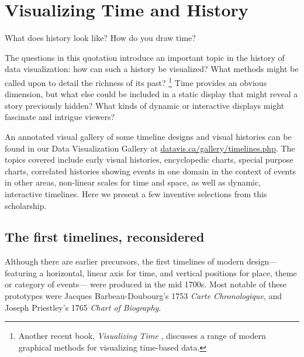 \section{Visualizing Time and History}\label{sec:vistime}

\epigraph{What does history look like?  How do you draw time?}{\citet[p. 10]{RosenbergGrafton:2010}}
The questions in this quotation introduce an important topic in the history of data visualization:  how can such a history be visualized? What methods might be called upon to detail the richness of its past?%
\footnote{Another recent book, \emph{Visualizing Time} \citep{Wills:2012}, discusses a range of  modern graphical methods for visualizing time-based data.} 
Time provides an obvious dimension, but what else could be included in a static display that might reveal a story previously hidden? What kinds of dynamic or interactive displays might fascinate and intrigue viewers? 

An annotated visual gallery of some timeline designs and visual histories can be found in our Data Visualization Gallery at \url{datavis.ca/gallery/timelines.php}. The topics covered include early visual histories, encyclopedic charts, special purpose charts, correlated histories showing events in one domain in the context of events in other areas, non-linear scales for time and space, as well as dynamic, interactive timelines.  Here we present a few inventive selections from this scholarship.

\subsection{The first timelines, reconsidered}
Although there are earlier precursors, the first timelines of modern design--- featuring a horizontal, linear axis for time, and vertical positions for place, theme or category of events--- were produced in the mid 1700s. Most notable of these prototypes were Jacques Barbeau-Doubourg's 1753 \emph{Carte Chronologique}, and Joseph Priestley's 1765 \emph{Chart of Biography}.

